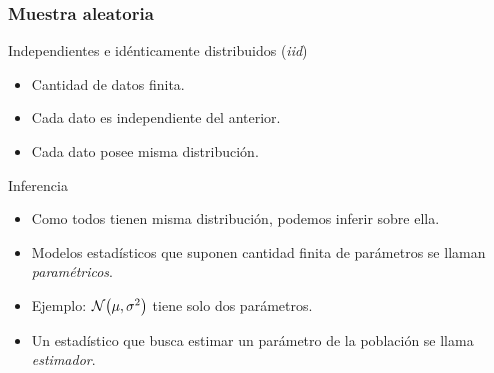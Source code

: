 \documentclass[table]{beamer}
\begin{document}
\begin{frame}
    \frametitle{Muestra aleatoria}
    \begin{block}{Independientes e idénticamente distribuidos (\emph{iid})}
        \begin{itemize}
            \item Cantidad de datos finita.
            \item Cada dato es independiente del anterior.
            \item Cada dato posee misma distribución.
        \end{itemize}
    \end{block}
    \begin{block}{Inferencia}
        \begin{itemize}
            \item Como todos tienen misma distribución, podemos inferir sobre ella.
            \item Modelos estadísticos que suponen cantidad finita de parámetros se llaman \emph{paramétricos}.
            \item Ejemplo: $\normal{\mu}{\sigma^{2}}$ tiene solo dos parámetros.
            \item Un estadístico que busca estimar un parámetro de la población se llama \emph{estimador}.
        \end{itemize}
    \end{block}
\end{frame}
\end{document}
